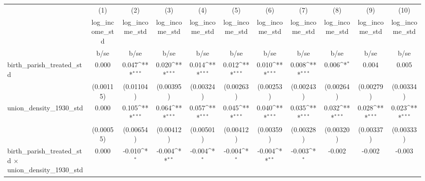 {
\def\sym#1{\ifmmode^{#1}\else\(^{#1}\)\fi}
\begin{tabular}{l*{10}{c}}
\hline\hline
                    &\multicolumn{1}{c}{(1)}&\multicolumn{1}{c}{(2)}&\multicolumn{1}{c}{(3)}&\multicolumn{1}{c}{(4)}&\multicolumn{1}{c}{(5)}&\multicolumn{1}{c}{(6)}&\multicolumn{1}{c}{(7)}&\multicolumn{1}{c}{(8)}&\multicolumn{1}{c}{(9)}&\multicolumn{1}{c}{(10)}\\
                    &\multicolumn{1}{c}{log\_income\_std}&\multicolumn{1}{c}{log\_income\_std}&\multicolumn{1}{c}{log\_income\_std}&\multicolumn{1}{c}{log\_income\_std}&\multicolumn{1}{c}{log\_income\_std}&\multicolumn{1}{c}{log\_income\_std}&\multicolumn{1}{c}{log\_income\_std}&\multicolumn{1}{c}{log\_income\_std}&\multicolumn{1}{c}{log\_income\_std}&\multicolumn{1}{c}{log\_income\_std}\\
                    &        b/se         &        b/se         &        b/se         &        b/se         &        b/se         &        b/se         &        b/se         &        b/se         &        b/se         &        b/se         \\
\hline
birth\_parish\_treated\_std&       0.000         &       0.047\sym{***}&       0.020\sym{***}&       0.014\sym{***}&       0.012\sym{***}&       0.010\sym{***}&       0.008\sym{***}&       0.006\sym{*}  &       0.004         &       0.005         \\
                    &   (0.00115)         &   (0.01104)         &   (0.00395)         &   (0.00324)         &   (0.00263)         &   (0.00253)         &   (0.00243)         &   (0.00264)         &   (0.00279)         &   (0.00334)         \\
union\_density\_1930\_std&       0.000         &       0.105\sym{***}&       0.064\sym{***}&       0.057\sym{***}&       0.045\sym{***}&       0.040\sym{***}&       0.035\sym{***}&       0.032\sym{***}&       0.028\sym{***}&       0.023\sym{***}\\
                    &   (0.00055)         &   (0.00654)         &   (0.00412)         &   (0.00501)         &   (0.00412)         &   (0.00359)         &   (0.00328)         &   (0.00320)         &   (0.00337)         &   (0.00333)         \\
birth\_parish\_treated\_std $\times$ union\_density\_1930\_std&       0.000         &      -0.010\sym{*}  &      -0.004\sym{**} &      -0.004\sym{*}  &      -0.004\sym{*}  &      -0.004\sym{**} &      -0.003\sym{*}  &      -0.002         &      -0.002         &      -0.003         \\

\end{tabular}}
